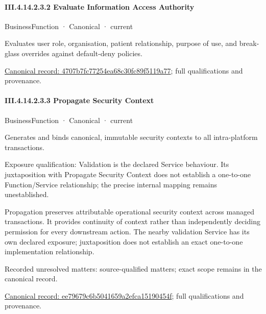 \paragraph*{III.4.14.2.3.2 Evaluate Information Access Authority}
\label{navigation:III.4.14.2.3.2}

\label{element:4707b7fc77254ea68c30fc89f5119a77}
{\small BusinessFunction · Canonical · current}\par

Evaluates user role, organisation, patient relationship, purpose of use, and break-glass overrides against default-deny policies.


{\footnotesize \href{../../../../continuum/business/business-function/4707b7fc77254ea68c30fc89f5119a77.md}{Canonical record: 4707b7fc77254ea68c30fc89f5119a77}; full qualifications and provenance.}\par
\paragraph*{III.4.14.2.3.3 Propagate Security Context}
\label{navigation:III.4.14.2.3.3}

\label{element:ee79679c6b5041659a2efca15190454f}
{\small BusinessFunction · Canonical · current}\par

Generates and binds canonical, immutable security contexts to all intra-platform transactions.



Exposure qualification: Validation is the declared Service behaviour. Its juxtaposition with Propagate Security Context does not establish a one-to-one Function/Service relationship; the precise internal mapping remains unestablished.



Propagation preserves attributable operational security context across managed transactions. It provides continuity of context rather than independently deciding permission for every downstream action. The nearby validation Service has its own declared exposure; juxtaposition does not establish an exact one-to-one implementation relationship.


{\small Recorded unresolved matters: source-qualified matters; exact scope remains in the canonical record.}\par
{\footnotesize \href{../../../../continuum/business/business-function/ee79679c6b5041659a2efca15190454f.md}{Canonical record: ee79679c6b5041659a2efca15190454f}; full qualifications and provenance.}\par

